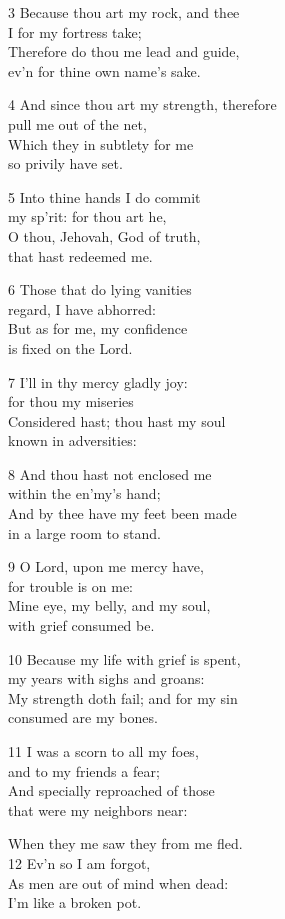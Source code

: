 \begin{multicols}{3}
3 Because thou art my rock, and thee\\
I for my fortress take;\\
Therefore do thou me lead and guide,\\
ev’n for thine own name’s sake.

4 And since thou art my strength, therefore\\
pull me out of the net,\\
Which they in subtlety for me\\
so privily have set.

5 Into thine hands I do commit\\
my sp’rit: for thou art he,\\
O thou, Jehovah, God of truth,\\
that hast redeemed me.

6 Those that do lying vanities\\
regard, I have abhorred:\\
But as for me, my confidence\\
is fixed on the Lord.

7 I’ll in thy mercy gladly joy:\\
for thou my miseries\\
Considered hast; thou hast my soul\\
known in adversities:

8 And thou hast not enclosed me\\
within the en’my’s hand;\\
And by thee have my feet been made\\
in a large room to stand.

9 O Lord, upon me mercy have,\\
for trouble is on me:\\
Mine eye, my belly, and my soul,\\
with grief consumed be.

10 Because my life with grief is spent,\\
my years with sighs and groans:\\
My strength doth fail; and for my sin\\
consumed are my bones.

11 I was a scorn to all my foes,\\
and to my friends a fear;\\
And specially reproached of those\\
that were my neighbors near:

When they me saw they from me fled.\\
12 Ev’n so I am forgot,\\
As men are out of mind when dead:\\
I’m like a broken pot.


\end{multicols}
